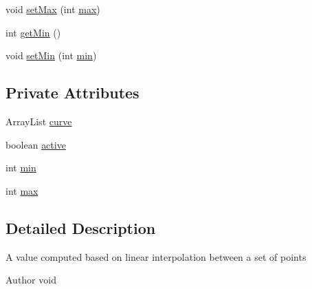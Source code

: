 \begin{DoxyCompactItemize}
void \mbox{\hyperlink{classorg_1_1newdawn_1_1slick_1_1particles_1_1_configurable_emitter_1_1_linear_interpolator_ae6c2d4d3b1014034581b67056e7863d3}{set\+Max}} (int \mbox{\hyperlink{classorg_1_1newdawn_1_1slick_1_1particles_1_1_configurable_emitter_1_1_linear_interpolator_adc1986c1f968ccd9155e19fac44c66da}{max}})
\item 
int \mbox{\hyperlink{classorg_1_1newdawn_1_1slick_1_1particles_1_1_configurable_emitter_1_1_linear_interpolator_a564cab8dc7718f08c588976c6190765b}{get\+Min}} ()
\item 
void \mbox{\hyperlink{classorg_1_1newdawn_1_1slick_1_1particles_1_1_configurable_emitter_1_1_linear_interpolator_ab8f7a467949157b5f7e8185416a9d60b}{set\+Min}} (int \mbox{\hyperlink{classorg_1_1newdawn_1_1slick_1_1particles_1_1_configurable_emitter_1_1_linear_interpolator_aa1aa9af8efa3ec59587abfb5a4831e42}{min}})
\end{DoxyCompactItemize}
\subsection*{Private Attributes}
\begin{DoxyCompactItemize}
\item 
Array\+List \mbox{\hyperlink{classorg_1_1newdawn_1_1slick_1_1particles_1_1_configurable_emitter_1_1_linear_interpolator_a2029dd987ff4a634d2bc06e5828852c4}{curve}}
\item 
boolean \mbox{\hyperlink{classorg_1_1newdawn_1_1slick_1_1particles_1_1_configurable_emitter_1_1_linear_interpolator_a0f28ab5311b6eaa1a406818811e39b54}{active}}
\item 
int \mbox{\hyperlink{classorg_1_1newdawn_1_1slick_1_1particles_1_1_configurable_emitter_1_1_linear_interpolator_aa1aa9af8efa3ec59587abfb5a4831e42}{min}}
\item 
int \mbox{\hyperlink{classorg_1_1newdawn_1_1slick_1_1particles_1_1_configurable_emitter_1_1_linear_interpolator_adc1986c1f968ccd9155e19fac44c66da}{max}}
\end{DoxyCompactItemize}


\subsection{Detailed Description}
A value computed based on linear interpolation between a set of points

\begin{DoxyAuthor}{Author}
void 
\end{DoxyAuthor}


